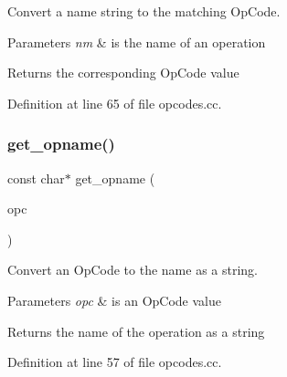 Convert a name string to the matching Op\+Code. 


\begin{DoxyParams}{Parameters}
{\em nm} & is the name of an operation \\
\hline
\end{DoxyParams}
\begin{DoxyReturn}{Returns}
the corresponding Op\+Code value 
\end{DoxyReturn}


Definition at line 65 of file opcodes.\+cc.

\mbox{\label{opcodes_8hh_af739d367233d5c761457f782e249ce7a}} 
\subsubsection{\texorpdfstring{get\_opname()}{get\_opname()}}
{\footnotesize\ttfamily const char$\ast$ get\+\_\+opname (\begin{DoxyParamCaption}\item[{\mbox{\hyperlink{opcodes_8hh_abeb7dfb0e9e2b3114e240a405d046ea7}{Op\+Code}}}]{opc }\end{DoxyParamCaption})}



Convert an Op\+Code to the name as a string. 


\begin{DoxyParams}{Parameters}
{\em opc} & is an Op\+Code value \\
\hline
\end{DoxyParams}
\begin{DoxyReturn}{Returns}
the name of the operation as a string 
\end{DoxyReturn}


Definition at line 57 of file opcodes.\+cc.

